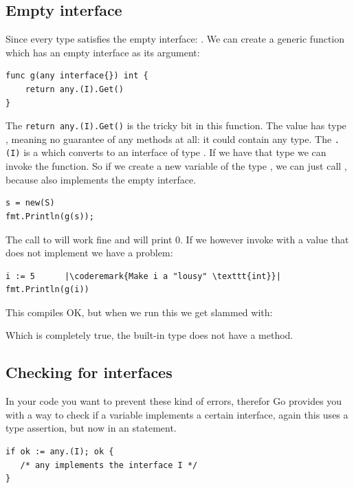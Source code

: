 \subsection{Empty interface}
Since every type satisfies the empty interface:
. We can create a generic function which 
has an empty interface as its argument:
\begin{lstlisting}[caption=A function with a empty interface argument,label=src:interface empty]
func g(any interface{}) int { 
    return any.(I).Get() 
}
\end{lstlisting}
The \lstinline{return any.(I).Get()} is the tricky bit in this function.
The value  has type , meaning no guarantee
of any methods at all: it could contain any type. The \lstinline{.(I)}
is a  which converts  to an interface of
type . If we have that type we can invoke the 
function.
So if we create a new variable of the type , we can just
call , because  also implements the empty interface.
\begin{lstlisting}
s = new(S)
fmt.Println(g(s));
\end{lstlisting}
The call to  will work fine and will print 0. If we however
invoke  with a value that does not implement  we have
a problem:
\begin{lstlisting}[caption=Failing to implement an interface,label=src:interface fail]
i := 5		|\coderemark{Make i a "lousy" \texttt{int}}|
fmt.Println(g(i))
\end{lstlisting}
This compiles OK, but when we run this we get slammed with:

\noindent{}

\noindent{}Which is completely true, the built-in type  does not
have a  method.

\subsection{Checking for interfaces}
In your code you want to prevent these kind of errors, therefor Go provides you 
with a way to check if a variable implements a certain interface, again this 
uses a type assertion, but now in an  statement.

\begin{lstlisting}
if ok := any.(I); ok { 
   /* any implements the interface I */
} 
\end{lstlisting}

